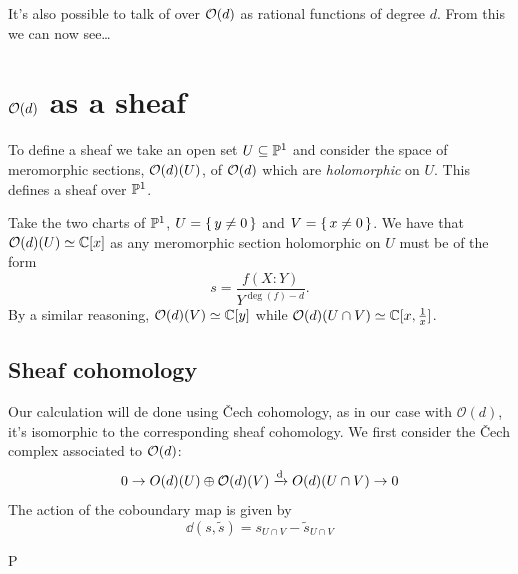 \documentclass[12pt]{memoir}
\def\nextra {P}
\begin{document}
It's also possible to talk of  over $\mathcal{O}(d)$ as rational functions of degree $d$. From this we can now see\dots

\section{$\mathcal{O}(d)$ as a sheaf}

To define a sheaf we take an open set $U\subseteq\mathbb{P}^1$ and consider the space of meromorphic sections, $\mathcal{O}(d)(U)$, of $\mathcal{O}(d)$ which are \emph{holomorphic} on $U$. This defines a sheaf over $\mathbb{P}^1$. 

\begin{Ex}
Take the two charts of $\mathbb{P}^1$, $U=\{\,y\neq 0\,\}$ and $V=\{\,x\neq 0\,\}$. We have that $\mathcal{O}(d)(U)\simeq\mathbb{C}[x]$ as any meromorphic section holomorphic on $U$ must be of the form 
$$s=\frac{f(X:Y)}{Y^{\deg(f)-d}}.$$
By a similar reasoning, $\mathcal{O}(d)(V)\simeq\mathbb{C}[y]$ while $\mathcal{O}(d)(U\cap V)\simeq \mathbb{C}[x,\frac{1}{x}]$.
\end{Ex}

\subsection{Sheaf cohomology}

Our calculation will de done using \v{C}ech cohomology, as in our case with \(\mathcal{O}(d)\), it's isomorphic to the corresponding sheaf cohomology.
We first consider the \v{C}ech complex associated to $\mathcal{O}(d)$:
$$0\to O(d)(U)\oplus\mathcal{O}(d)(V)\xrightarrow[]{\dd}O(d)(U\cap V)\to 0$$
The action of the coboundary map is given by 
$$\dd(s,\tilde{s})=s_{U\cap V}-\tilde{s}_{U\cap V}$$


\ifx\nextra\undefined
\printindex
\else\fi
\nocite{*}


\end{document}
